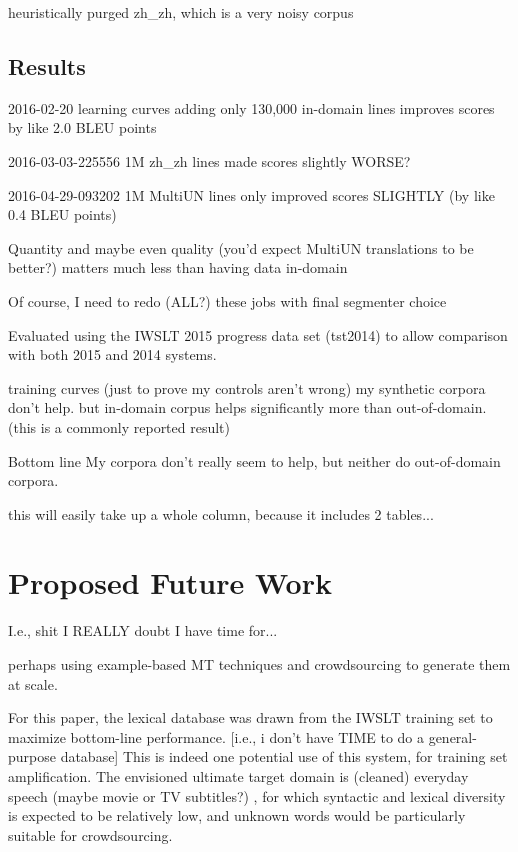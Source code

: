 heuristically purged zh\_zh, which is a very noisy corpus

\subsection{Results}

2016-02-20 learning curves adding only 130,000 in-domain lines improves scores by like 2.0 BLEU points

2016-03-03-225556 1M zh\_zh lines made scores slightly WORSE?

2016-04-29-093202 1M MultiUN lines only improved scores SLIGHTLY (by like 0.4 BLEU points)

Quantity and maybe even quality (you'd expect MultiUN translations to be better?) matters much less than having data in-domain

Of course, I need to redo (ALL?) these jobs with final segmenter choice

Evaluated using the IWSLT 2015 progress data set (tst2014) to allow comparison with both 2015 and 2014 systems.

training curves (just to prove my controls aren't wrong)
my synthetic corpora don't help. 
but in-domain corpus helps significantly more than out-of-domain. (this is a commonly reported result)

Bottom line
My corpora don't really seem to help, but neither do out-of-domain corpora.

this will easily take up a whole column, because it includes 2 tables...

\section{Proposed Future Work}
\label{sec:future}

I.e., shit I REALLY doubt I have time for...


perhaps using example-based MT techniques  and crowdsourcing to generate them at scale.

For this paper, the lexical database was drawn from the IWSLT training set to maximize bottom-line performance.
[i.e., i don't have TIME to do a general-purpose database]
This is indeed one potential use of this system, for training set amplification.
The envisioned ultimate target domain is (cleaned) everyday speech (maybe movie or TV subtitles?) , for which syntactic and lexical diversity is expected to be relatively low, and unknown words would be particularly suitable for crowdsourcing.

